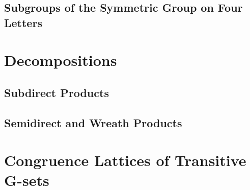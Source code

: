 \subsection{Subgroups of the Symmetric Group on Four Letters}


\newpage
\section{Decompositions}
\subsection{Subdirect Products}


\subsection{Semidirect and Wreath Products}


\section{Congruence Lattices of Transitive G-sets}



%
%
%
%






